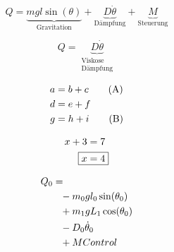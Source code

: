 \documentclass{scrartcl}
\begin{document}
\begin{equation*}
	Q =
	\underbrace{mgl\sin(\theta)}_{\text{Gravitation}}
	+
	\underbrace{D\dot{\theta}}_{\text{Dämpfung}}
	+
	\underbrace{M}_{\text{Steuerung}}
\end{equation*}

\[
Q =
\underbrace{D\dot{\theta}}_{
	\substack{
		\text{Viskose}\\
		\text{Dämpfung}
	}
}
\]


\begin{align}
	a &= b + c \tag{A}\\
	d &= e + f \notag\\
	g &= h + i \tag{B}
\end{align}

\begin{align}
	x + 3 &= 7\\
	\Aboxed{x &= 4}
\end{align}

\begin{align}
	\MoveEqLeft Q_0 = \\ %
	&- m_0 g l_0 \sin(\theta_0) \notag\\
	&+ m_1 g L_1 \cos(\theta_0) \notag\\
	&- D_0 \dot{\theta}_0 \notag\\
	&+ MControl
\end{align}
\end{document}
